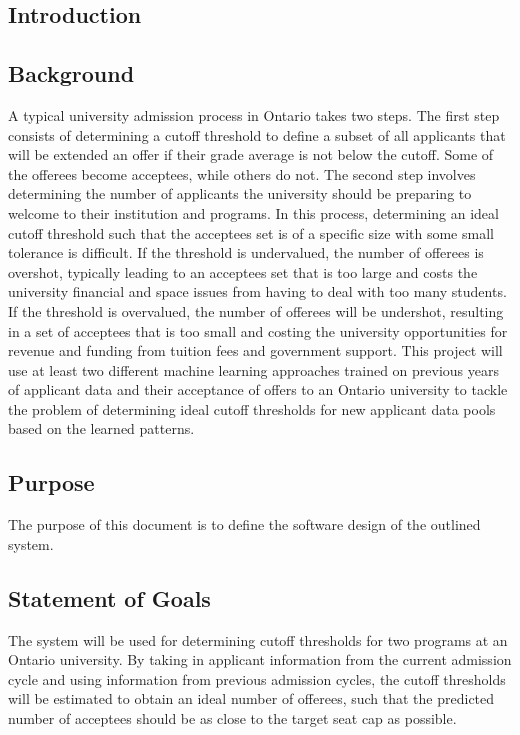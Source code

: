 \documentclass{article}
\begin{document}
	\newpage
    \begin{normalsize}
    \tableofcontents
    \newpage
    
    \section{Introduction}
        \subsection{Background}
        A typical university admission process in Ontario takes two steps.
        The first step consists of determining a cutoff threshold to define a subset of all applicants that will be extended an offer if their grade average is not below the cutoff.
        Some of the offerees become acceptees, while others do not. The second step involves determining the number of applicants the university should be preparing to welcome to their institution and programs. \newline
        \indent In this process, determining an ideal cutoff threshold such that the acceptees set is of a specific size with some small tolerance is difficult.
        If the threshold is undervalued, the number of offerees is overshot, typically leading to an acceptees set that is too large and costs the university financial and space issues from having to deal with too many students.
        If the threshold is overvalued, the number of offerees will be undershot, resulting in a set of acceptees that is too small and costing the university opportunities for revenue and funding from tuition fees and government support. \newline
        \indent This project will use at least two different machine learning approaches trained on previous years of applicant data and their acceptance of offers to an Ontario university to tackle the problem of determining ideal cutoff thresholds for new applicant data pools based on the learned patterns.
    
        \subsection{Purpose}
        The purpose of this document is to define the software design of the outlined system.
        
        \subsection{Statement of Goals}
        The system will be used for determining cutoff thresholds for two programs at an Ontario university. \newline
        \indent By taking in applicant information from the current admission cycle and using information from previous admission cycles, the cutoff thresholds will be estimated to obtain an ideal number of offerees, such that the predicted number of acceptees should be as close to the target seat cap as possible.
        

\end{normalsize}
\end{document}
